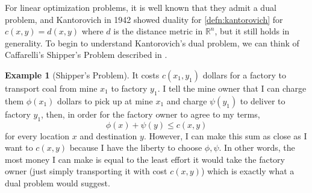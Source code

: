 \documentclass[psamsfonts]{amsart}
\newcommand{\R}{\mathbb{R}}
\theoremstyle{definition}
\newtheorem{exmp}{Example}[section]
\numberwithin{equation}{section}
\begin{document}
For linear optimization problems, it is well known that they admit a dual problem, and Kantorovich in 1942 showed duality for \autoref{defn:kantorovich} for $c(x,y) = d(x,y)$ where $d$ is the distance metric in $\R^n$, but it still holds in generality. 
To begin to understand Kantorovich's dual problem, we can think of Caffarelli's Shipper's Problem described in \cite{villani}.
\begin{exmp}[Shipper's Problem]\label{exmp:ship}
  It costs $c(x_1,y_1)$ dollars for a factory to transport coal from mine $x_1$ to factory $y_1$. I tell the mine owner that I can charge them $\phi(x_1)$ dollars to pick up at mine $x_1$ and charge $\psi(y_1)$ to deliver to factory $y_1$, then, in order for the factory owner to agree to my terms, 
  \[\phi(x)+\psi(y)\le c(x,y)\]
  for every location $x$ and destination $y$. However, I can make this sum as close as I want to $c(x,y)$ because I have the liberty to choose $\phi,\psi$. In other words, the most money I can make is equal to the least effort it would take the factory owner (just simply transporting it with cost $c(x,y)$) which is exactly what a dual problem would suggest.
\end{exmp}
\end{document}
